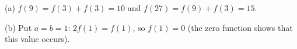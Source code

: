 (a) $f(9)=f(3)+f(3)=10$ and $f(27)=f(9)+f(3)=\boxed{15}$.

(b) Put $a=b=1$: $2f(1)=f(1)$, so $f(1)=\boxed{0}$ (the zero function shows that this value occurs).
